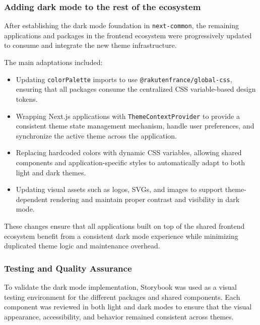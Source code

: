 \subsubsection{Adding dark mode to the rest of the ecosystem}

After establishing the dark mode foundation in \lstinline|next-common|, the remaining applications and packages in the frontend ecosystem were progressively updated to consume and integrate the new theme infrastructure.

The main adaptations included:

\begin{itemize}
    \item Updating \lstinline|colorPalette| imports to use \lstinline|@rakutenfrance/global-css|, ensuring that all packages consume the centralized CSS variable-based design tokens.
    
    \item Wrapping Next.js applications with \lstinline|ThemeContextProvider| to provide a consistent theme state management mechanism, handle user preferences, and synchronize the active theme across the application.
    
    \item Replacing hardcoded colors with dynamic CSS variables, allowing shared components and application-specific styles to automatically adapt to both light and dark themes.
    
    \item Updating visual assets such as logos, SVGs, and images to support theme-dependent rendering and maintain proper contrast and visibility in dark mode.
\end{itemize}

These changes ensure that all applications built on top of the shared frontend ecosystem benefit from a consistent dark mode experience while minimizing duplicated theme logic and maintenance overhead.

\subsubsection{Testing and Quality Assurance}

To validate the dark mode implementation, Storybook was used as a visual testing environment for the different packages and shared components. Each component was reviewed in both light and dark modes to ensure that the visual appearance, accessibility, and behavior remained consistent across themes.

